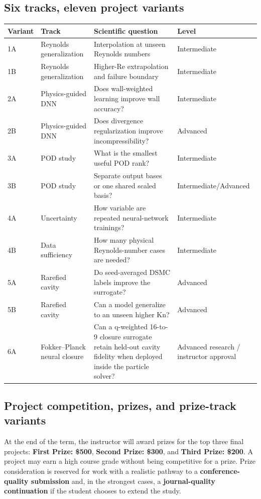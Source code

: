 \documentclass[11pt]{article}
\begin{document}
\subsection{Six tracks, eleven project variants}
\begin{tabularx}{\textwidth}{@{}p{}p{}YY@{}}
\toprule
\textbf{Variant} & \textbf{Track} & \textbf{Scientific question} & \textbf{Level}\\
\midrule
1A & Reynolds generalization & Interpolation at unseen Reynolds numbers & Intermediate\\
1B & Reynolds generalization & Higher-Re extrapolation and failure boundary & Intermediate\\
2A & Physics-guided DNN & Does wall-weighted learning improve wall accuracy? & Intermediate\\
2B & Physics-guided DNN & Does divergence regularization improve incompressibility? & Advanced\\
3A & POD study & What is the smallest useful POD rank? & Intermediate\\
3B & POD study & Separate output bases or one shared scaled basis? & Intermediate/Advanced\\
4A & Uncertainty & How variable are repeated neural-network trainings? & Intermediate\\
4B & Data sufficiency & How many physical Reynolds-number cases are needed? & Intermediate\\
5A & Rarefied cavity & Do seed-averaged DSMC labels improve the surrogate? & Advanced\\
5B & Rarefied cavity & Can a model generalize to an unseen higher Kn? & Advanced\\
6A & Fokker--Planck neural closure & Can a q-weighted 16-to-9 closure surrogate retain held-out cavity fidelity when deployed inside the particle solver? & Advanced research / instructor approval\\
\bottomrule
\end{tabularx}

\subsection{Project competition, prizes, and prize-track variants}
\begin{prizebox}
At the end of the term, the instructor will award prizes for the top three final projects:
\textbf{First Prize: \$500}, \textbf{Second Prize: \$300}, and \textbf{Third Prize: \$200}.
A project may earn a high course grade without being competitive for a prize. Prize consideration is reserved for work with a realistic pathway to a \textbf{conference-quality submission} and, in the strongest cases, a \textbf{journal-quality continuation} if the student chooses to extend the study.
\end{prizebox}
\end{document}
